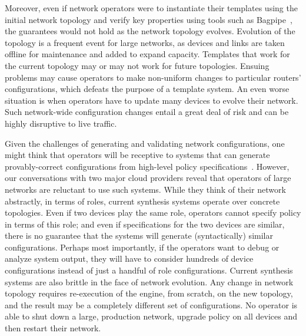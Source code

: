 \documentclass[numbers, 10pt]{sigplanconf}
\begin{document}
Moreover, even if network operators were to instantiate their templates using the initial network 
topology and verify key properties using tools such as Bagpipe~\cite{bagpipe}, the guarantees
would not hold as the network topology evolves. Evolution of the topology is a frequent event for large networks, as  devices and links are taken offline for maintenance and  added to expand
capacity.  
Templates that
work for the current topology may or may not work for future
topologies. Ensuing problems may cause operators to make non-uniform changes to particular routers' configurations,
which defeats the purpose of a template system.  An even worse situation is when
operators have to update many devices to evolve their network.  
Such network-wide configuration changes entail a great deal of risk and can be highly
disruptive to live traffic.


Given the challenges of generating and validating network configurations, one
might think that operators will be receptive to systems that can generate
provably-correct configurations from high-level policy
specifications~\cite{narain+:configassure,propane,synet-synthesis}. However, our conversations
with two major cloud providers reveal that operators of large networks are
reluctant to use such systems. While they think of their network abstractly, in
terms of roles, current synthesis systems operate over concrete topologies.  
Even if two devices play the same role, operators cannot specify policy in terms of
this role; and even if specifications for the two devices are similar,
there is no guarantee that the systems will generate (syntactically) similar
configurations.  Perhaps most importantly, if the operators want to debug or analyze system output, they
will have to consider hundreds of device configurations instead of just a handful of
role configurations. Current synthesis systems are also brittle in the face of network
evolution. Any change in network topology requires re-execution of the engine,
from scratch, on the new topology, and the result may be a completely different
set of configurations.  No operator is
able to shut down a large, production network, upgrade policy on all devices and 
then restart their network.
\end{document}
